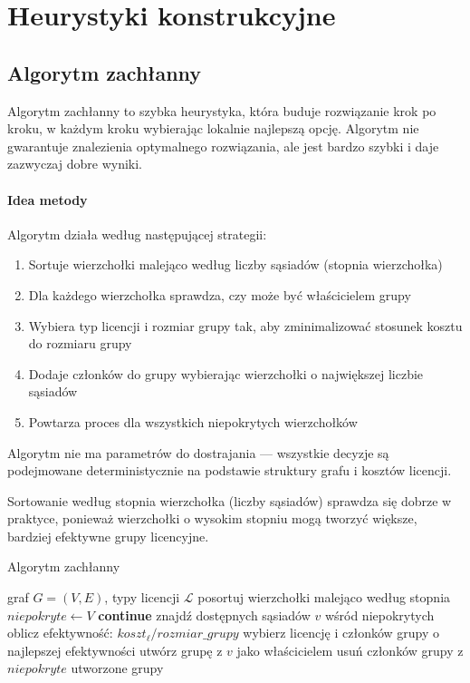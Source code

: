 \section{Heurystyki konstrukcyjne}

\subsection{Algorytm zachłanny}\label{subsec:greedy}

Algorytm zachłanny to szybka heurystyka, która buduje rozwiązanie krok po kroku, w każdym kroku wybierając lokalnie najlepszą opcję. Algorytm nie gwarantuje znalezienia optymalnego rozwiązania, ale jest bardzo szybki i daje zazwyczaj dobre wyniki.

\paragraph{Idea metody}
Algorytm działa według następującej strategii:
\begin{enumerate}
  \item Sortuje wierzchołki malejąco według liczby sąsiadów (stopnia wierzchołka)
  \item Dla każdego wierzchołka sprawdza, czy może być właścicielem grupy
  \item Wybiera typ licencji i rozmiar grupy tak, aby zminimalizować stosunek kosztu do rozmiaru grupy
  \item Dodaje członków do grupy wybierając wierzchołki o największej liczbie sąsiadów
  \item Powtarza proces dla wszystkich niepokrytych wierzchołków
\end{enumerate}

Algorytm nie ma parametrów do dostrajania — wszystkie decyzje są podejmowane deterministycznie na podstawie struktury grafu i kosztów licencji.

Sortowanie według stopnia wierzchołka (liczby sąsiadów) sprawdza się dobrze w praktyce, ponieważ wierzchołki o wysokim stopniu mogą tworzyć większe, bardziej efektywne grupy licencyjne.

\begin{algorithm}[H]
  \caption{Algorytm zachłanny}
  \label{alg:greedy}
  \begin{algorithmic}[1]
    \Require graf $G=(V,E)$, typy licencji $\mathcal{L}$
    \State posortuj wierzchołki malejąco według stopnia
    \State $niepokryte \gets V$
     \textbf{continue} \EndIf
    \State znajdź dostępnych sąsiadów $v$ wśród niepokrytych
    \State oblicz efektywność: $koszt_\ell / rozmiar\_grupy$
    \EndFor
    \State wybierz licencję i członków grupy o najlepszej efektywności
    \State utwórz grupę z $v$ jako właścicielem
    \State usuń członków grupy z $niepokryte$
    \EndFor
    \State \Return utworzone grupy
  \end{algorithmic}
\end{algorithm}


